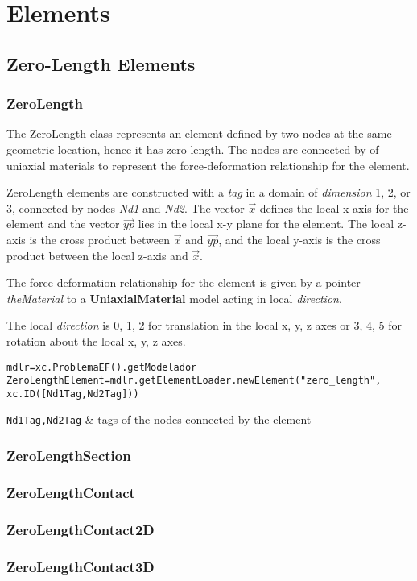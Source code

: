 \chapter{Elements}

\section{Zero-Length Elements}
\subsection{ZeroLength}
The ZeroLength class represents an element defined by two nodes at the same geometric location, hence it has zero length.
The nodes are connected by of uniaxial materials to represent the force-deformation relationship for the element. 

ZeroLength elements are constructed with a {\em tag} in a domain of {\em dimension} 1, 2, or 3, connected by nodes {\em Nd1} and {\em Nd2}. 
The vector $\vec{x}$ defines the local x-axis for the element and the vector $\vec{yp}$ lies in the local x-y plane for the element.  The local z-axis is the cross product between $\vec{x}$ and $\vec{yp}$, and the local y-axis is the cross product between the local z-axis and $\vec{x}$.

The force-deformation relationship for the element is given by a pointer {\em theMaterial} to a {\bf UniaxialMaterial} model acting in local {\em direction}.

The local {\em direction} is 0, 1, 2 for translation in the local x, y, z axes or 3, 4, 5 for rotation about the local x, y, z axes. 

\begin{verbatim}
mdlr=xc.ProblemaEF().getModelador
ZeroLengthElement=mdlr.getElementLoader.newElement("zero_length",
xc.ID([Nd1Tag,Nd2Tag]))
\end{verbatim}
\begin{paramFuncTable}
{\tt Nd1Tag,Nd2Tag} & tags of the nodes connected by the element\\
\end{paramFuncTable}
\begin{paramClassTable}
\ElementParam{}
\ElementZERODParam{}
\end{paramClassTable}

\begin{methodsTable}
\ElementMeth{}
\ElementZERODMeth{}
\end{methodsTable}

\subsection{ZeroLengthSection}



\subsection{ZeroLengthContact}


\subsection{ZeroLengthContact2D}


\subsection{ZeroLengthContact3D}

